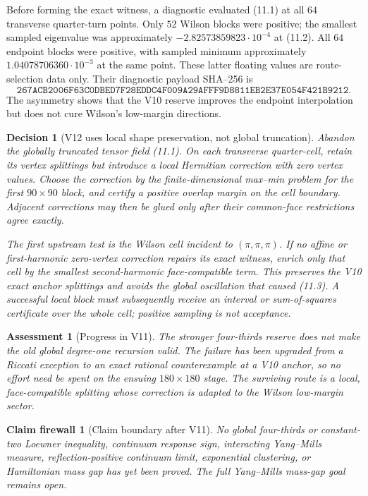 \documentclass[11pt,oneside]{article}
\newtheorem{assessment}[theorem]{Assessment}
\newtheorem{firewall}[theorem]{Claim firewall}
\newtheorem{decision}[theorem]{Decision}
\theoremstyle{definition}
\theoremstyle{remark}
\begin{document}
Before forming the exact witness, a diagnostic evaluated (11.1) at
all \(64\) transverse quarter-turn points.  Only \(52\) Wilson blocks
were positive; the smallest sampled eigenvalue was approximately
\(-2.82573859823\cdot10^{-4}\) at (11.2).  All \(64\) endpoint blocks
were positive, with sampled minimum approximately
\(1.04078706360\cdot10^{-3}\) at the same point.  These latter
floating values are route-selection data only.  Their diagnostic
payload SHA--256 is
\[
\texttt{267ACB2006F63C0DBED7F28EDDC4F009A29AFFF9D8811EB2E37E054F421B9212}.
                                                               \tag{11.7}
\]
The asymmetry shows that the V10 reserve improves the endpoint
interpolation but does not cure Wilson's low-margin directions.

\begin{decision}[V12 uses local shape preservation, not global truncation]
\label{dec:newv11-next}
Abandon the globally truncated tensor field (11.1).  On each
transverse quarter-cell, retain its vertex splittings but introduce
a local Hermitian correction with zero vertex values.  Choose the
correction by the finite-dimensional max--min problem for the first
\(90\times90\) block, and certify a positive overlap margin on the
cell boundary.  Adjacent corrections may then be glued only after
their common-face restrictions agree exactly.

The first upstream test is the Wilson cell incident to
\((\pi,\pi,\pi)\).  If no affine or first-harmonic zero-vertex
correction repairs its exact witness, enrich only that cell by the
smallest second-harmonic face-compatible term.  This preserves the
V10 exact anchor splittings and avoids the global oscillation that
caused (11.3).  A successful local block must subsequently receive an
interval or sum-of-squares certificate over the whole cell; positive
sampling is not acceptance.
\end{decision}

\begin{assessment}[Progress in V11]
\label{ass:newv11-progress}
The stronger four-thirds reserve does not make the old global
degree-one recursion valid.  The failure has been upgraded from a
Riccati exception to an exact rational counterexample at a V10
anchor, so no effort need be spent on the ensuing \(180\times180\)
stage.  The surviving route is a local, face-compatible splitting
whose correction is adapted to the Wilson low-margin sector.
\end{assessment}

\begin{firewall}[Claim boundary after V11]
\label{fire:newv11-final}
No global four-thirds or constant-two Loewner
inequality, continuum response sign, interacting Yang--Mills
measure, reflection-positive continuum limit, exponential
clustering, or Hamiltonian mass gap has yet been proved.  The full
Yang--Mills mass-gap goal remains open.
\end{firewall}
\end{document}
